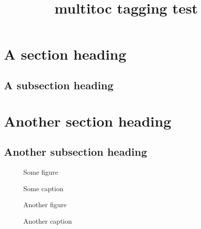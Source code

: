 \documentclass{article}
\title{multitoc tagging test}
\begin{document}
\tableofcontents

\listoffigures

\section{A section heading}
\subsection{A subsection heading}
\section{Another section heading}
\subsection{Another subsection heading}

\begin{figure}
Some figure
\caption{Some caption}
\end{figure}
\begin{figure}
Another figure
\caption{Another caption}
\end{figure}
\end{document}
